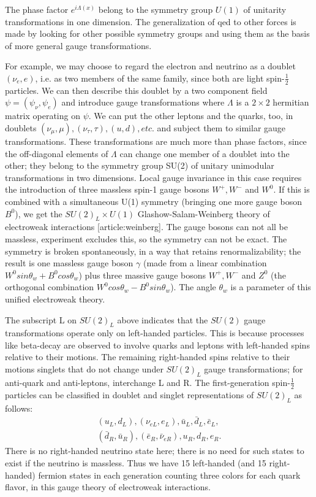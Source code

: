 The phase factor $e^{i\Lambda(x)}$ belong to the symmetry group $U(1)$ of unitarity transformations in one dimension. The generalization of {qed} to other forces is made by looking for other possible symmetry groups and using them as the basis of more general gauge transformations. 
        
For example, we may choose to regard the electron and neutrino as a doublet $(\nu_e,e)$, i.e. as two members of the same family, since both are light spin-$\frac{1}{2}$ particles. We can then describe this doublet by a two component field $\psi = (\psi_\nu,\psi_e)$ and introduce gauge transformations where $\Lambda$ is a $2\times 2$ hermitian matrix operating on $\psi$.  We can put the other leptons and the quarks, too, in doublets $(\nu_\mu,\mu),(\nu_\tau,\tau),(u,d),etc.$ and subject them to similar gauge transformations. These transformations are much more than phase factors, since the off-diagonal elements of $\Lambda$ can change one member of a doublet into the other; they belong to the symmetry group SU(2) of unitary unimodular transformations in two dimensions. Local gauge invariance in this case requires the introduction of three massless spin-1 gauge bosons $W^+,W^-$ and $W^0$. If this is combined with a simultaneous U(1) symmetry (bringing one more gauge boson $B^0$), we get the $SU(2)_L\times U(1)$ Glashow-Salam-Weinberg theory of electroweak interactions [article:weinberg]. The gauge bosons can not all be massless, experiment excludes this, so the symmetry can not be exact. The symmetry is broken spontaneously, in a way that retains renormalizability; the result is one massless gauge boson $\gamma$ (made from a linear combination $W^0sin\theta_w +B^0cos\theta_w$) plus three massive gauge bosons $W^+, W^-$ and $Z^0$ (the orthogonal combination $W^0cos\theta_w - B^0sin\theta_w$). The angle $\theta_w$ is a parameter of this unified electroweak theory.

The subscript L on $SU(2)_L$ above indicates that the $SU(2)$ gauge transformations operate only on left-handed particles. This is because processes like beta-decay are observed to involve quarks and leptons with left-handed spins relative to their motions. The remaining right-handed spins relative to their motions singlets that do not change under $SU(2)_L$ gauge transformations; for anti-quark and anti-leptons, interchange L and R. The first-generation spin-$\frac{1}{2}$ particles can be classified in doublet and singlet representations of $SU(2)_L$ as follows:
    \begin{eqnarray}
    (u_L,d_L),(\nu_{eL},e_L),\bar{u}_L,\bar{d}_L,\bar{e}_L, \nonumber \\
    (\bar{d}_R,\bar{u}_R),(\bar{e}_R,\bar{\nu}_{eR}),u_R,d_R,e_R.   \nonumber
    \end{eqnarray}
There is no right-handed neutrino state here; there is no need for such states to exist if the neutrino is massless. Thus we have 15 left-handed (and 15 right-handed) fermion states in each generation counting three colors for each quark flavor, in this gauge theory of electroweak interactions.

